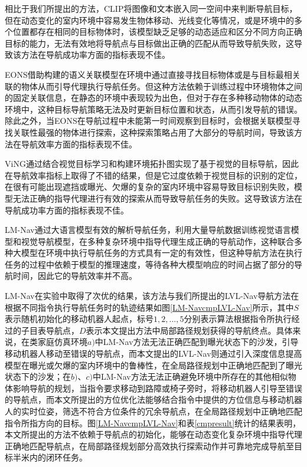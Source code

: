 相比于我们所提出的方法，CLIP将图像和文本嵌入同一空间中来判断导航目标，但在动态变化的室内环境中容易发生物体移动、光线变化等情况，或是环境中的多个位置都存在相同的目标物体时，该模型缺乏足够的动态适应和区分不同方向正确目标的能力，无法有效地将导航点与目标做出正确的匹配从而导致导航失败，这导致该方法在导航成功率方面的指标表现不佳。

EONS借助构建的语义关联模型在环境中通过直接寻找目标物体或是与目标最相关联的物体从而引导代理执行导航任务。但这种方法依赖于训练过程中环境物体之间的固定关联信息，在静态的环境中表现较为出色，但对于存在多种移动物体的动态环境中，这种目标导航策略无法及时更新目标位置和状态，从而引发导航的错误。除此之外，当EONS在导航过程中未能第一时间观察到目标时，会根据关联模型寻找关联性最强的物体进行探索，这种探索策略占用了大部分的导航时间，导致该方法在导航效率方面的指标表现不佳。

ViNG通过结合视觉目标学习和构建环境拓扑图实现了基于视觉的目标导航，因此在导航效率指标上取得了不错的结果，但是它过度依赖于视觉目标的识别的定位，在很有可能出现遮挡或曝光、欠爆的复杂的室内环境中容易导致目标识别失败，模型无法正确的指导代理进行有效的探索从而导致导航任务的失败。这导致该方法在导航成功率方面的指标表现不佳。

LM-Nav通过大语言模型有效的解析导航任务，利用大量导航数据训练视觉语言模型和视觉导航模型，在多种复杂环境中指导代理生成正确的导航动作，这种联合多种大模型在环境中执行导航任务的方式具有一定的有效性，但这种导航方法在执行任务的过程中依赖于模型的推理速度，等待各种大模型响应的时间占据了部分的导航时间，因此它的导航效率并不高。

LM-Nav在实验中取得了次优的结果，该方法与我们所提出的LVL-Nav导航方法在根据不同指令执行导航任务时的轨迹结果如图\ref{LM-NavcmpLVL-Nav}所示，其中$S$表示随机初始化的移动机器人起点，标号$1,2,...,5$分别表示算法根据指令所执行经过的子目表导航点，$D$表示本文提出方法中局部路径规划获得的导航终点。具体来说，在类家庭仿真环境$a)$中LM-Nav方法无法正确匹配到曝光状态下的沙发，引导移动机器人移动至错误的导航点，而本文提出的LVL-Nav则通过引入深度信息提高模型在曝光或欠爆的室内环境中的鲁棒性，在全局路径规划中正确地匹配到了曝光状态下的沙发；在$b)$、$c)$中LM-Nav方法无法正确避免环境中所存在的其他相似物体影响导航的规划，当指令要求移动到路障或椅子旁时，将移动机器人引导至错误的导航点，而本文所提出的方位优化法能够结合指令中提供的方位信息与移动机器人的实时位姿，筛选不符合方位条件的冗余导航点，在全局路径规划中正确地匹配指令所指方向的目标。图\ref{LM-NavcmpLVL-Nav}和表\ref{cmpresult}统计的结果表明，本文所提出的方法不依赖于导航点的初始化，能够在动态变化复杂环境中指导代理正确地匹配导航点，在局部路径规划部分高效执行探索动作并可靠地完成导航至目标半米内的闭环任务。


